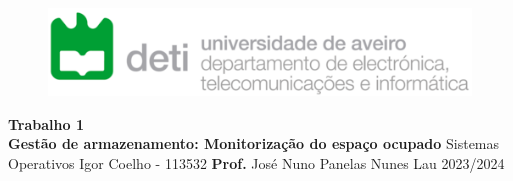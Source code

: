 \begin{figure}
    \centering
    \includegraphics[width=12cm]{deti.png}
    \vskip 3cm
\end{figure}
\begin{center}
    \centering
    \huge{\textbf{Trabalho 1}}
    \\
    \huge{\textbf{Gestão de armazenamento: \newline Monitorização do espaço ocupado}}
    \vskip 1cm
    \large{Sistemas Operativos}
    \vskip 2cm
    \large{Igor Coelho - 113532}
    \vfill
    \textbf{Prof.} José Nuno Panelas Nunes Lau
    \vfill
    \large{2023/2024}
\end{center}
\thispagestyle{empty}

